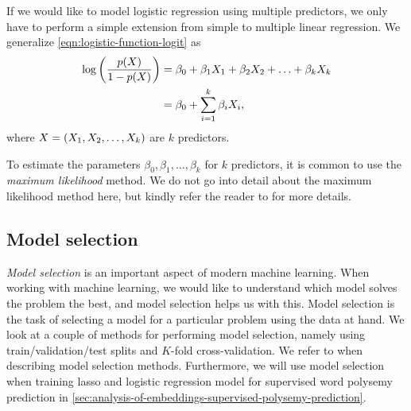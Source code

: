 If we would like to model logistic regression using multiple predictors, we only have to perform a simple extension from simple to multiple linear regression. We generalize \cref{eqn:logistic-function-logit} as
\begin{align}
    \log \left(\frac{p(X)}{1 - p(X)}\right)
    &= \beta_0 + \beta_1 X_1 + \beta_2 X_2 + \ldots + \beta_k X_k \label{eqn:logistic-function-logit-multiple} \\
    &= \beta_0 + \sum\limits_{i=1}^{k}{\beta_i X_i}, \notag
\end{align}
where $X = \left(X_1, X_2, \ldots, X_k\right)$ are $k$ predictors.

To estimate the parameters $\beta_0, \beta_1, \ldots, \beta_k$ for $k$ predictors, it is common to use the \textit{maximum likelihood} method. We do not go into detail about the maximum likelihood method here, but kindly refer the reader to \cite[p. 214]{fox2015applied} for more details.

\subsection{Model selection}
\label{sec:model-selection}
\textit{Model selection} is an important aspect of modern machine learning. When working with machine learning, we would like to understand which model solves the problem the best, and model selection helps us with this. Model selection is the task of selecting a model for a particular problem using the data at hand. We look at a couple of methods for performing model selection, namely using train/validation/test splits and $K$-fold cross-validation. We refer to \cite{James2013} when describing model selection methods. Furthermore, we will use model selection when training lasso and logistic regression model for supervised word polysemy prediction in \cref{sec:analysis-of-embeddings-supervised-polysemy-prediction}.


